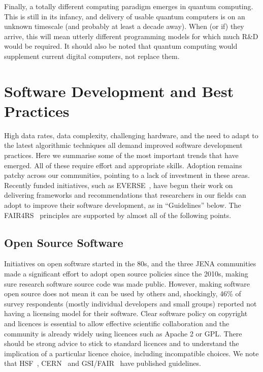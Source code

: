 Finally, a totally different computing paradigm emerges in quantum computing. This is still in its infancy, and delivery of usable quantum computers is on an unknown timescale (and probably at least a decade away). When (or if) they arrive, this will mean utterly different programming models for which much R\&D would be required. It should also be noted that quantum computing would supplement current digital computers, not replace them.


\section{Software Development and Best Practices}

High data rates, data complexity, challenging hardware, and the need to adapt to the latest algorithmic techniques all demand improved software development practices. Here we summarise some of the most important trends that have emerged. All of these require effort and appropriate skills. Adoption remains patchy across our communities, pointing to a lack of investment in these areas. Recently funded initiatives, such as EVERSE~\cite{EVERSE}, have begun their work on delivering frameworks and recommendations that researchers in our fields can adopt to improve their software development, as in ``Guidelines'' below. The FAIR4RS~\cite{Barker2022} principles are supported by almost all of the following points.

\subsection{Open Source Software}

Initiatives on open software started in the 80s, and the three JENA communities made a significant effort to adopt open source policies since the 2010s, making sure research software source code was made public. However, making software open source does not mean it can be used by others and, shockingly, 46\% of survey respondents (mostly individual developers and small groups) reported not having a licensing model for their software.
Clear software policy on copyright and licences is essential to allow effective scientific collaboration and the community is already widely using licences such as Apache 2 or GPL. There should be strong advice to stick to standard licences and to understand the implication of a particular licence choice, including incompatible choices. We note that HSF~\cite{jouvin_2016_1469636}, CERN~\cite{Fluckiger:1482206} and GSI/FAIR~\cite{GSIFAIROpenSource} have published guidelines. 

